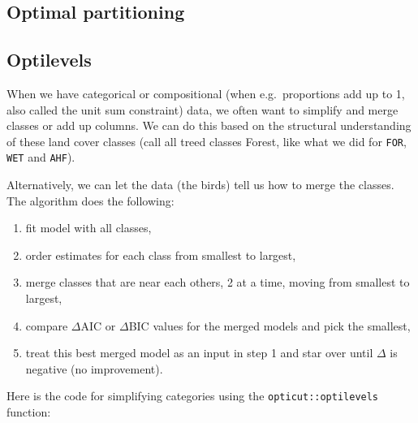 \documentclass[12pt,]{book}
\newenvironment{Shaded}{\begin{snugshade}}{\end{snugshade}}
\newcommand{\DataTypeTok}[1]{\textcolor[rgb]{0.13,0.29,0.53}{#1}}
\newcommand{\DecValTok}[1]{\textcolor[rgb]{0.00,0.00,0.81}{#1}}
\newcommand{\KeywordTok}[1]{\textcolor[rgb]{0.13,0.29,0.53}{\textbf{#1}}}
\newcommand{\NormalTok}[1]{#1}
\newcommand{\OperatorTok}[1]{\textcolor[rgb]{0.81,0.36,0.00}{\textbf{#1}}}
\newcommand{\StringTok}[1]{\textcolor[rgb]{0.31,0.60,0.02}{#1}}
\providecommand{\tightlist}{%
  \setlength{\itemsep}{0pt}\setlength{\parskip}{0pt}}
\begin{document}
\hypertarget{optimal-partitioning}{%
\subsection{Optimal partitioning}\label{optimal-partitioning}}

\begin{Shaded}
\end{Shaded}

\hypertarget{optilevels}{%
\subsection{Optilevels}\label{optilevels}}

When we have categorical or compositional (when e.g.~proportions add up to 1, also called
the unit sum constraint) data,
we often want to simplify and merge classes or add up columns.
We can do this based on the structural understanding of these land cover classes
(call all treed classes Forest, like what we did for \texttt{FOR}, \texttt{WET} and \texttt{AHF}).

Alternatively, we can let the data (the birds) tell us how to merge the classes.
The algorithm does the following:

\begin{enumerate}
\def\labelenumi{\arabic{enumi}.}
\tightlist
\item
  fit model with all classes,
\item
  order estimates for each class from smallest to largest,
\item
  merge classes that are near each others, 2 at a time, moving from smallest to largest,
\item
  compare \(\Delta\)AIC or \(\Delta\)BIC values for the merged models and pick the smallest,
\item
  treat this best merged model as an input in step 1 and star over until \(\Delta\) is negative (no improvement).
\end{enumerate}

Here is the code for simplifying categories using the \texttt{opticut::optilevels} function:
\end{document}
